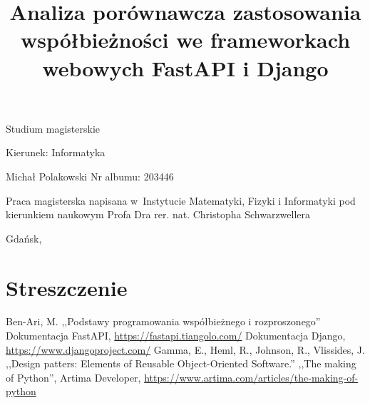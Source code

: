 \documentclass[12pt,a4paper,oneside,openany,parskip=full,parindent=full]{book}
\begin{document}
\begin{center}

\vspace{1cm}

Studium magisterskie
\end{center}

\vspace{1cm}

\noindent Kierunek: Informatyka

\vspace{1cm}

{
\leftskip=10cm\noindent
Michał Polakowski\newline
Nr albumu: 203446\newline
}

\vspace{2cm}

\title{Analiza porównawcza zastosowania współbieżności we frameworkach webowych FastAPI i Django}
\makeatletter

\begin{center}
\LARGE\bf
\@title
\end{center}

\vspace{2cm}

{
\leftskip=8cm\noindent
Praca magisterska\newline 
napisana w~Instytucie Matematyki, Fizyki i Informatyki\newline
pod kierunkiem naukowym\newline
Profa Dra rer. nat. Christopha Schwarzwellera
}

\vfill

\begin{center}
Gdańsk, \the\year
\end{center}
\thispagestyle{empty}

\clearpage
\thispagestyle{empty}
\clearpage

\tableofcontents

\clearpage
\chapter*{Streszczenie}









\clearpage
\begin{thebibliography}{100} 
 Ben-Ari, M. ,,Podstawy programowania współbieżnego i rozproszonego''
 Dokumentacja FastAPI, \url{https://fastapi.tiangolo.com/}
 Dokumentacja Django, \url{https://www.djangoproject.com/}
 Gamma, E., Heml, R., Johnson, R., Vlissides, J. ,,Design patters: Elements of Reusable Object-Oriented Software.''
 ,,The making of Python'', Artima Developer, \url{https://www.artima.com/articles/the-making-of-python}
\end{thebibliography}

\clearpage
\end{document}

